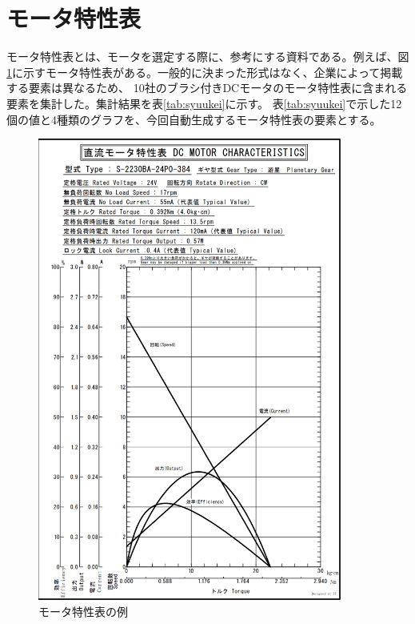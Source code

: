 \section{モータ特性表}\label{mortoku}
モータ特性表とは、モータを選定する際に、参考にする資料である\cite{仕様の見方}。例えば、図\ref{fig:rei_mortoku}に示すモータ特性表がある。一般的に決まった形式はなく、企業によって掲載する要素は異なるため、
10社のブラシ付きDCモータのモータ特性表\cite{特性表1,特性表2,特性表3,特性表4,特性表5,特性表6,特性表7,特性表8,特性表9,特性表10}に含まれる要素を集計した。集計結果を表\ref{tab:syuukei}に示す。
表\ref{tab:syuukei}で示した12個の値と4種類のグラフを、今回自動生成するモータ特性表の要素とする。
	\begin{figure}[t]
		\centering
		\includegraphics[width=10cm]{./Image/rei_mortoku.png}
		\caption{モータ特性表の例}
		\label{fig:rei_mortoku}
	  \end{figure} 

